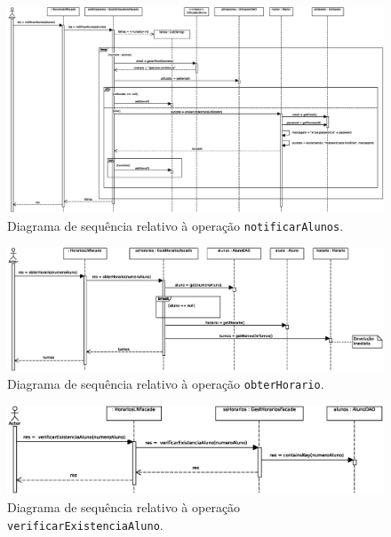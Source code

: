 \documentclass[12pt, a4paper]{article}
\begin{document}
\begin{landscape}
        \vspace*{\fill}
        \pagebreak
        \vspace*{\fill}

        \begin{figure}[H]
            \centering
            \includegraphics[scale=0.60]{Imagens/Modelos/notificarAlunosDAO.svg.eps}
            \caption{
                Diagrama de sequência relativo à operação \texttt{notificarAlunos}.
            }
        \end{figure}

        \vspace*{\fill}
        \pagebreak
        \vspace*{\fill}

        \begin{figure}[H]
            \centering
            \includegraphics[scale=0.8]{Imagens/Modelos/obterHorarioDAO.svg.eps}
            \caption{
                Diagrama de sequência relativo à operação \texttt{obterHorario}.
            }
        \end{figure}

        \vspace*{\fill}
        \pagebreak
        \vspace*{\fill}

        \begin{figure}[H]
            \centering
            \includegraphics[scale=1.0]{Imagens/Modelos/verificarExistenciaAlunoDAO.svg.eps}
            \caption{
                Diagrama de sequência relativo à operação \texttt{verificarExistenciaAluno}.
            }
        \end{figure}


\end{landscape}
\end{document}
